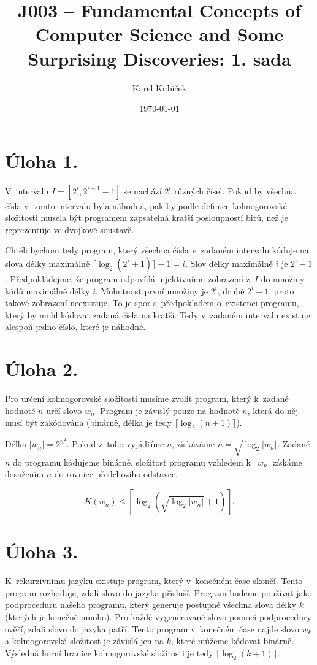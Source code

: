 \documentclass[a4paper]{article}
\title{J003 -- Fundamental Concepts of Computer Science and Some Surprising Discoveries: 1. sada}
\author{Karel Kubíček}
\date{\today}
\begin{document}
\maketitle

\section*{Úloha 1.}
V~intervalu $I = [2^{i},2^{i+1}-1]$ se nachází $2^{i}$ různých čísel. Pokud by všechna čísla v~tomto intervalu byla náhodná, pak by podle definice kolmogorovské složitosti musela být programem zapsatelná kratší posloupností bitů, než je reprezentuje ve dvojkové soustavě.

Chtěli bychom tedy program, který všechna čísla v~zadaném intervalu kóduje na slova délky maximálně $\lceil \log_{2}(2^{i} + 1)\rceil - 1 = i$. Slov délky maximálně $i$ je $2^{i}-1$. Předpokládejme, že program odpovídá injektivnímu zobrazení z~$I$ do množiny kódů maximálně délky $i$. Mohutnost první množiny je $2^{i}$, druhé $2^{i}-1$, proto takové zobrazení neexistuje. To je spor s~předpokladem o~existenci programu, který by mohl kódovat zadaná čísla na kratší. Tedy v~zadaném intervalu existuje alespoň jedno číslo, které je náhodné.


\section*{Úloha 2.}
Pro určení kolmogorovské složitosti musíme zvolit program, který k~zadané hodnotě $n$ určí slovo $w_{n}$. Program je závislý pouze na hodnotě $n$, která do něj musí být zakódována (binárně, délka je tedy $\lceil \log_{2}(n + 1)\rceil$).{}

Délka $|w_{n}| = 2^{n^{2}}$. Pokud z~toho vyjádříme $n$, získáváme $n = \sqrt{\log_{2} |w_{n}|}$. Zadané $n$ do programu kódujeme binárně, složitost programu vzhledem k~$|w_{n}|$ získáme dosažením $n$ do rovnice předchozího odstavce.

$$K(w_{n}) \leq \left\lceil \log_{2} \left(\sqrt{\log_{2} |w_{n}|} + 1\right)\right\rceil.$$


\section*{Úloha 3.}
K~rekurzivnímu jazyku existuje program, který v~konečném čase skončí. Tento program rozhoduje, zdali slovo do jazyka přísluší. Program budeme používat jako podproceduru našeho programu, který generuje postupně všechna slova délky $k$ (kterých je konečně mnoho). Pro každé vygenerované slovo pomocí podprocedury ověří, zdali slovo do jazyka patří. Tento program v~konečném čase najde slovo $w_{k}$ a kolmogorovská složitost je závislá jen na $k$, které můžeme kódovat binárně. Výsledná horní hranice kolmogorovské složitosti je tedy $\lceil \log_{2}(k + 1)\rceil$.
\end{document}
